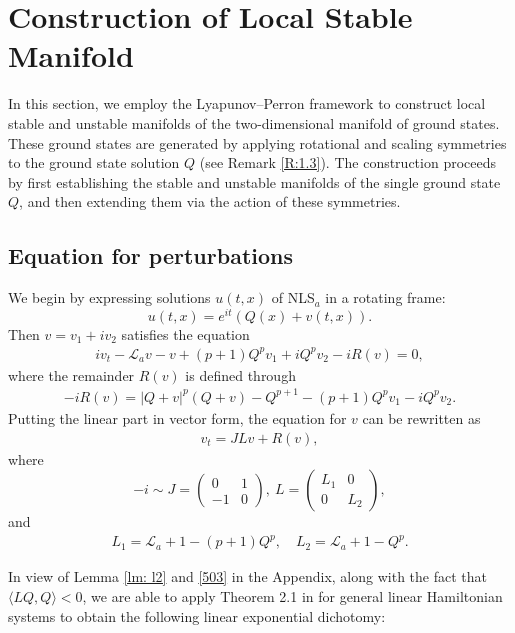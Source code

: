 \documentclass[12pt]{amsart}
\newcommand{\la}{\mathcal L_a}
\begin{document}
 


\section{Construction of Local Stable Manifold}\label{S:manifold}


In this section, we employ the Lyapunov–Perron framework to construct local stable and unstable manifolds of the two-dimensional manifold of ground states. These ground states are generated by applying rotational and scaling symmetries to the ground state solution $Q$ (see Remark \ref{R:1.3}). The construction proceeds by first establishing the stable and unstable manifolds of the single ground state $Q$, and then extending them via the action of these symmetries.

\subsection{Equation for perturbations}
We begin by expressing solutions $u(t,x)$ of NLS$_a$ in a rotating frame:
\[u(t,x)=e^{it}(Q(x)+v(t,x)).\]
Then $v=v_1+iv_2$ satisfies the equation 
\begin{align}\label{1205}
iv_t-\la v-v+(p+1)Q^p v_1+iQ^p v_2-iR(v)=0, 
\end{align}
where the remainder $R(v)$ is defined through
\begin{align}\label{r}
-iR(v)=|Q+v|^p(Q+v)-Q^{p+1}-(p+1)Q^pv_1-iQ^p v_2.
\end{align}
Putting the linear part in vector form, the equation for $v$ can be rewritten as 
\begin{align}\label{1102}
v_t=JL v+R(v),
\end{align}
where 
\[-i\sim J=\begin{pmatrix}0&1\\-1&0\end{pmatrix}, \ L=\begin{pmatrix}L_1&0\\0& L_2\end{pmatrix},\]
and 
\begin{align}\label{l1l2}
L_1=\la+1-(p+1)Q^p, \quad L_2=\la+1-Q^p. 
\end{align}

In view of Lemma \ref{lm: l2} and \eqref{503} in the Appendix, along with the fact that $\langle LQ,Q\rangle<0$, we are able to apply Theorem 2.1 in \cite{LZ22} for general linear Hamiltonian systems to obtain the following linear exponential dichotomy:
\end{document}
